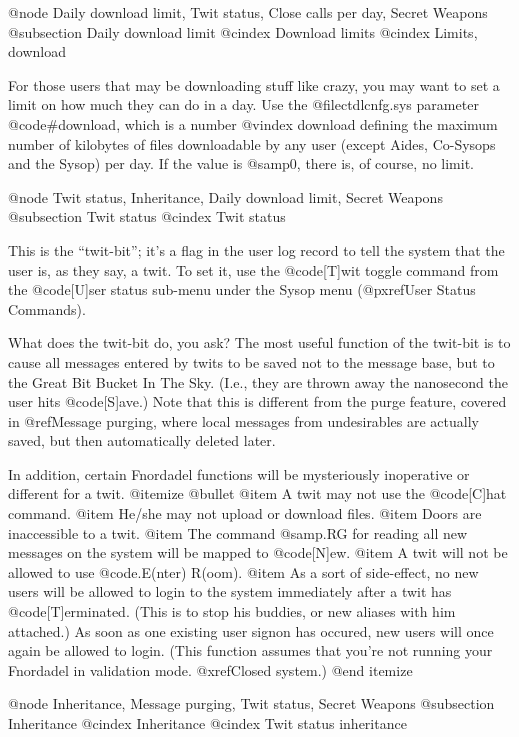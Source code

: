 @node Daily download limit, Twit status, Close calls per day, Secret Weapons
@subsection Daily download limit
@cindex Download limits
@cindex Limits, download

For those users that may be downloading stuff like crazy,
you may want to set a limit on how much they can do in a day.
Use the @file{ctdlcnfg.sys} parameter @code{#download}, which is a number
@vindex download
defining the maximum number of kilobytes of files downloadable
by any user (except Aides, Co-Sysops and the Sysop) per day.  If the value is
@samp{0}, there is, of course, no limit.

@node Twit status, Inheritance, Daily download limit, Secret Weapons
@subsection Twit status
@cindex Twit status

This is the ``twit-bit''; it's a flag in the user log
record to tell the system that the user is, as they say,
a twit.  To set it, use the @code{[T]wit toggle} command from
the @code{[U]ser status} sub-menu under the Sysop menu
(@pxref{User Status Commands}).

What does the twit-bit do, you ask?  The most useful function of the twit-bit
is to cause all messages entered by twits to be saved not to the message base,
but to the Great Bit Bucket In The Sky.  (I.e., they are thrown away the
nanosecond the user hits @code{[S]ave}.)  Note that this is different
from the purge feature, covered in @ref{Message purging}, where local
messages from undesirables are actually saved, but then automatically deleted
later.

In addition, certain Fnordadel functions will be
mysteriously inoperative or different for a twit.
@itemize @bullet
@item
A twit may not use the @code{[C]hat} command.
@item
He/she may not upload or download files.
@item
Doors are inaccessible to a twit.
@item
The command @samp{.RG} for reading all new
messages on the system will be mapped to @code{[N]ew}.
@item
A twit will not be allowed to
use @code{.E(nter) R(oom)}.
@item
As a sort of side-effect, no new
users will be allowed to login to the system immediately after
a twit has @code{[T]erminate}d.  (This is to stop his buddies, or new
aliases with him attached.)
As soon as one existing user signon has occured, new users will
once again be allowed to login.  (This function assumes that
you're not running your Fnordadel in validation mode.  @xref{Closed system}.)
@end itemize

@node Inheritance, Message purging, Twit status, Secret Weapons
@subsection Inheritance
@cindex Inheritance
@cindex Twit status inheritance

